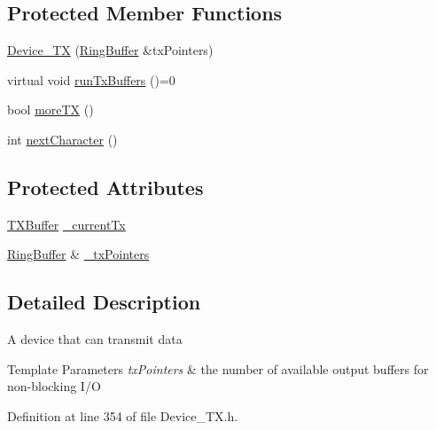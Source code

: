 \subsection*{Protected Member Functions}
\begin{DoxyCompactItemize}
\item 
\hyperlink{classflame_1_1_device___t_x_ac8cbfc24dbb82b3d0229c4f48046bed9}{Device\-\_\-\-T\-X} (\hyperlink{classflame_1_1_ring_buffer}{Ring\-Buffer} \&tx\-Pointers)
\item 
virtual void \hyperlink{classflame_1_1_device___t_x_af3cf3dc02a124e5a88841d325555ce3c}{run\-Tx\-Buffers} ()=0
\item 
bool \hyperlink{classflame_1_1_device___t_x_aa559b2481ade8d4ffb7c1a06a8c4aced}{more\-T\-X} ()
\item 
int \hyperlink{classflame_1_1_device___t_x_a238f4a5bbbc36cf2ee06f616008c537f}{next\-Character} ()
\end{DoxyCompactItemize}
\subsection*{Protected Attributes}
\begin{DoxyCompactItemize}
\item 
\hyperlink{classflame_1_1_t_x_buffer}{T\-X\-Buffer} \hyperlink{classflame_1_1_device___t_x_a8a7dfd6afba59f3144fd20f89186fd19}{\-\_\-current\-Tx}
\item 
\hyperlink{classflame_1_1_ring_buffer}{Ring\-Buffer} \& \hyperlink{classflame_1_1_device___t_x_a208fef1a96295f254b913180b5274160}{\-\_\-tx\-Pointers}
\end{DoxyCompactItemize}


\subsection{Detailed Description}
A device that can transmit data 
\begin{DoxyTemplParams}{Template Parameters}
{\em tx\-Pointers} & the number of available output buffers for non-\/blocking I/\-O \\
\hline
\end{DoxyTemplParams}


Definition at line 354 of file Device\-\_\-\-T\-X.\-h.



